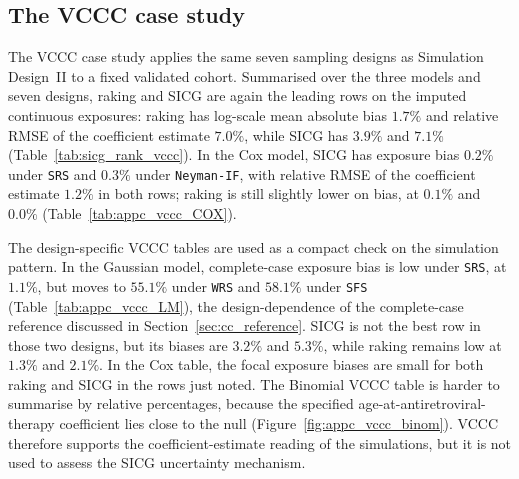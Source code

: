 \subsection{The VCCC case study}
\label{sec:sicg_sim_vccc}

The VCCC case study applies the same seven sampling designs as Simulation Design~II to a fixed validated cohort. Summarised over the three models and seven designs, raking and SICG are again the leading rows on the imputed continuous exposures: raking has log-scale mean absolute bias $1.7\%$ and relative RMSE of the coefficient estimate $7.0\%$, while SICG has $3.9\%$ and $7.1\%$ (Table~\ref{tab:sicg_rank_vccc}). In the Cox model, SICG has exposure bias $0.2\%$ under \texttt{SRS} and $0.3\%$ under \texttt{Neyman-IF}, with relative RMSE of the coefficient estimate $1.2\%$ in both rows; raking is still slightly lower on bias, at $0.1\%$ and $0.0\%$ (Table~\ref{tab:appc_vccc_COX}).

The design-specific VCCC tables are used as a compact check on the simulation pattern. In the Gaussian model, complete-case exposure bias is low under \texttt{SRS}, at $1.1\%$, but moves to $55.1\%$ under \texttt{WRS} and $58.1\%$ under \texttt{SFS} (Table~\ref{tab:appc_vccc_LM}), the design-dependence of the complete-case reference discussed in Section~\ref{sec:cc_reference}. SICG is not the best row in those two designs, but its biases are $3.2\%$ and $5.3\%$, while raking remains low at $1.3\%$ and $2.1\%$. In the Cox table, the focal exposure biases are small for both raking and SICG in the rows just noted. The Binomial VCCC table is harder to summarise by relative percentages, because the specified age-at-antiretroviral-therapy coefficient lies close to the null (Figure~\ref{fig:appc_vccc_binom}). VCCC therefore supports the coefficient-estimate reading of the simulations, but it is not used to assess the SICG uncertainty mechanism.

